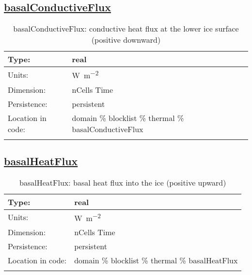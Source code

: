 \subsection[basalConductiveFlux]{\hyperref[sec:var_tab_thermal]{basalConductiveFlux}}
\label{subsec:var_sec_thermal_basalConductiveFlux}
\begin{center}
\begin{longtable}{| p{2.0in} | p{4.0in} |}
        \hline 
        Type: & real \\
        \hline 
        Units: & \si{W.m^{-2}} \\
        \hline 
        Dimension: & nCells Time \\
        \hline 
        Persistence: & persistent \\
        \hline 
         Location in code: & domain \% blocklist \% thermal \% basalConductiveFlux \\
         \hline 
    \caption{basalConductiveFlux: conductive heat flux at the lower ice surface (positive downward)}
\end{longtable}
\end{center}
\subsection[basalHeatFlux]{\hyperref[sec:var_tab_thermal]{basalHeatFlux}}
\label{subsec:var_sec_thermal_basalHeatFlux}
\begin{center}
\begin{longtable}{| p{2.0in} | p{4.0in} |}
        \hline 
        Type: & real \\
        \hline 
        Units: & \si{W.m^{-2}} \\
        \hline 
        Dimension: & nCells Time \\
        \hline 
        Persistence: & persistent \\
        \hline 
         Location in code: & domain \% blocklist \% thermal \% basalHeatFlux \\
         \hline 
    \caption{basalHeatFlux: basal heat flux into the ice (positive upward)}
\end{longtable}
\end{center}
